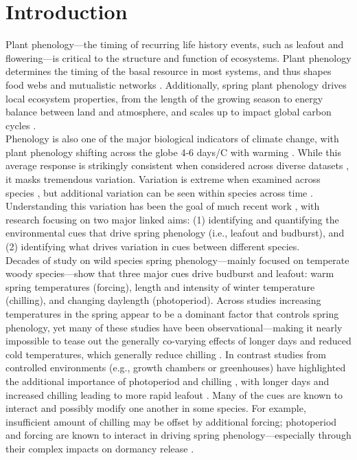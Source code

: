 \documentclass[11pt]{article}
\begin{document}
\section{Introduction}

Plant phenology---the timing of recurring life history events, such as leafout and flowering---is critical to the structure and function of ecosystems. Plant phenology determines the timing of the basal resource in most systems, and thus shapes food webs and mutualistic networks \cite{Cleland:2007aa}. Additionally, spring plant phenology drives local ecosystem properties, from the length of the growing season to energy balance between land and atmosphere, and scales up to impact global carbon cycles \cite{Richardson:2009aa}. \\

Phenology is also one of the major biological indicators of climate change, with plant phenology shifting across the globe 4-6 days/\degree C with warming \cite{Menzel:2006,IPCC:2014sm}. While this average response is strikingly consistent when considered across diverse datasets \cite{Wolkovich:2012aa}, it masks tremendous variation. Variation is extreme when examined across species \cite{Wolkovich:2014ab}, but additional variation can be seen within species across time \cite{yu2010,fu2015,zohner2017}. Understanding this variation has been the goal of much recent work \cite{Rutishauser:2008,Laube2015}, with research focusing on two major linked aims: (1) identifying and quantifying the environmental cues that drive spring phenology (i.e., leafout and budburst), and (2) identifying what drives variation in cues between different species.\\

Decades of study on wild species spring phenology---mainly focused on temperate woody species---show that three major cues drive budburst and leafout: warm spring temperatures (forcing), length and intensity of winter temperature (chilling), and changing daylength (photoperiod). Across studies increasing temperatures in the spring appear to be a dominant factor that controls spring phenology, yet many of these studies have been observational---making it nearly impossible to tease out the generally co-varying effects of longer days and reduced cold temperatures, which generally reduce chilling \cite{chuineJTB,Cook:2012pnas}. In contrast studies from controlled environments (e.g., growth chambers or greenhouses) have highlighted the additional importance of photoperiod and chilling \cite{Heide:1993b,Falusi:1996aa,Foley:2009aa,Ghelardini:2010aa,Caffarra:2011aa}, with longer days and increased chilling leading to more rapid leafout \cite{Caffarra:2011ab}. Many of the cues are known to interact and possibly modify one another in some species. For example, insufficient amount of chilling may be offset by additional forcing; photoperiod and forcing are known to interact in driving spring phenology---especially through their complex impacts on dormancy release \cite{chuineJTB}.\\
\end{document}

